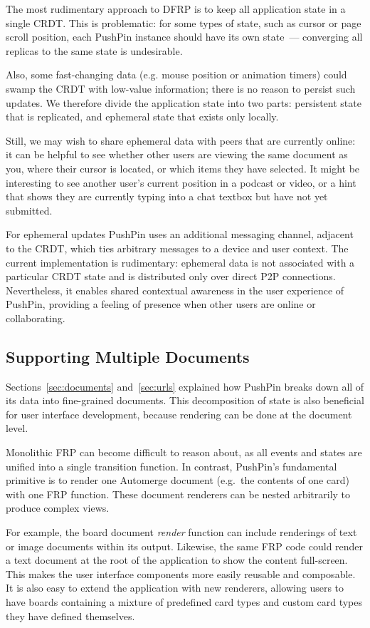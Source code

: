 \documentclass[sigplan,10pt]{acmart}
\begin{document}
The most rudimentary approach to DFRP is to keep all application state in a single CRDT. This is problematic: for some types of state, such as cursor or page scroll position, each PushPin instance should have its own state~--- converging all replicas to the same state is undesirable.

Also, some fast-changing data (e.g. mouse position or animation timers) could swamp the CRDT with low-value information; there is no reason to persist such updates.
We therefore divide the application state into two parts: persistent state that is replicated, and ephemeral state that exists only locally.

Still, we may wish to share ephemeral data with peers that are currently online: it can be helpful to see whether other users are viewing the same document as you, where their cursor is located, or which items they have selected. It might be interesting to see another user's current position in a podcast or video, or a hint that shows they are currently typing into a chat textbox but have not yet submitted.

For ephemeral updates PushPin uses an additional messaging channel, adjacent to the CRDT, which ties arbitrary messages to a device and user context. The current implementation is rudimentary: ephemeral data is not associated with a particular CRDT state and is distributed only over direct P2P connections. Nevertheless, it enables shared contextual awareness in the user experience of PushPin, providing a feeling of presence when other users are online or collaborating.

\subsection{Supporting Multiple Documents}

Sections~\ref{sec:documents} and~\ref{sec:urls} explained how PushPin breaks down all of its data into fine-grained documents.
This decomposition of state is also beneficial for user interface development, because rendering can be done at the document level.

Monolithic FRP can become difficult to reason about, as all events and states are unified into a single transition function. In contrast, PushPin's fundamental primitive is to render one Automerge document (e.g.\ the contents of one card) with one FRP function. These document renderers can be nested arbitrarily to produce complex views.

For example, the board document \emph{render} function can include renderings of text or image documents within its output. Likewise, the same FRP code could render a text document at the root of the application to show the content full-screen. This makes the user interface components more easily reusable and composable.
It is also easy to extend the application with new renderers, allowing users to have boards containing a mixture of predefined card types and custom card types they have defined themselves.
\end{document}
